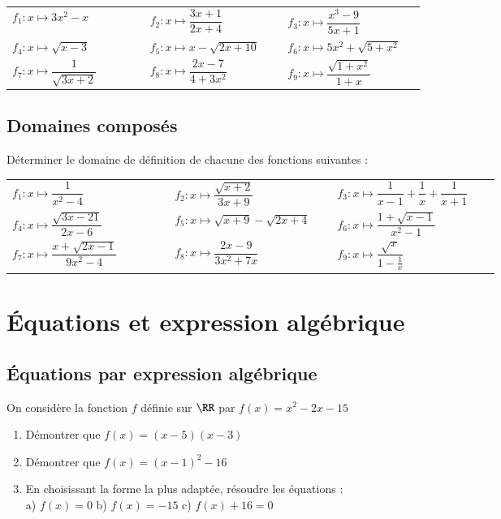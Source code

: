 \documentclass[oneside,12pt]{article}          			%
\begin{document}
\renewcommand{\arraystretch}{2}
\begin{tabular}{p{0.3\linewidth} p{0.3\linewidth} p{0.3\linewidth}}
	$f_1:x\mapsto 3x^2-x$ & $f_2:x\mapsto \dfrac{3x+1}{2x+4}$ & $f_3:x\mapsto \dfrac{x^3-9}{5x+1}$ \\
	$f_4:x\mapsto \sqrt{x-3}$ & $f_5:x\mapsto x-\sqrt{2x+10}$ & $f_6:x\mapsto 5x^2+\sqrt{5+x^2}$ \\
	$f_7:x\mapsto \dfrac{1}{\sqrt{3x+2}}$ & $f_8:x\mapsto \dfrac{2x-7}{4+3x^2}$ & $f_9:x\mapsto \dfrac{\sqrt{1+x^2}}{1+x}$
\end{tabular}



\subsection{Domaines composés}
Déterminer le domaine de définition de chacune des fonctions suivantes :

\renewcommand{\arraystretch}{2.75}
\begin{tabular}{p{0.3\linewidth} p{0.3\linewidth} p{0.3\linewidth}}
	$f_1:x\mapsto \dfrac{1}{x^2-4}$ & $f_2:x\mapsto \dfrac{\sqrt{x+2}}{3x+9}$ & $f_3:x\mapsto \dfrac{1}{x-1}+ \dfrac{1}{x} +\dfrac{1}{x+1}$ \\
	$f_4:x\mapsto \dfrac{\sqrt{3x-21}}{2x-6}$ & $f_5:x\mapsto \sqrt{x+9}-\sqrt{2x+4}$ & $f_6:x\mapsto \dfrac{1+\sqrt{x-1}}{x^2-1}$ \\
	$f_7:x\mapsto \dfrac{x+\sqrt{2x-1}}{9x^2-4}$ & $f_8:x\mapsto \dfrac{2x-9}{3x^2+7x}$ & $f_9:x\mapsto \dfrac{\sqrt{x}}{1-\frac{1}{x}}$
\end{tabular}



\section{Équations et expression algébrique}

\subsection{Équations par expression algébrique}
On considère la fonction $f$ définie sur $\RR$ par $f(x)=x^2-2x-15$
\begin{enumerate}
	\item Démontrer que $f(x)=(x-5)(x-3)$
	\item Démontrer que $f(x)=(x-1)^2-16$
	\item En choisissant la forme la plus adaptée, résoudre les équations : \\[5pt]
		a) $f(x)=0$ \qquad\qquad  b) $f(x)=-15$ \qquad\qquad  c) $f(x)+16=0$
\end{enumerate}
\end{document}

